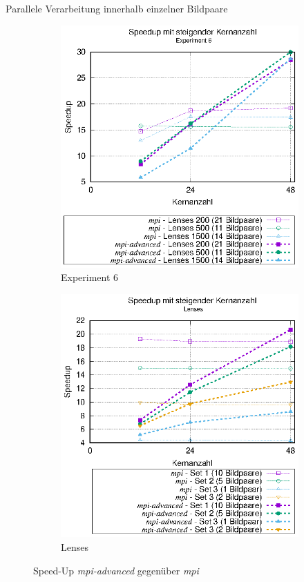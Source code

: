 \begin{frame}[allowframebreaks]{Parallele Verarbeitung innerhalb einzelner Bildpaare}
	\begin{figure}[h]
		\begin{subfigure}[b]{0.47\textwidth}
			\centering
			\includegraphics[width=\textwidth]{pdf/mpi_advanced_speedup_exp6}
			\caption{Experiment 6}
		\end{subfigure}
		\hfill
		\begin{subfigure}[b]{0.47\textwidth}
			\centering
			\includegraphics[width=\textwidth]{pdf/mpi_advanced_speedup_lenses}
			\caption{Lenses}
		\end{subfigure}
		\caption{Speed-Up \textit{mpi-advanced} gegenüber \textit{mpi}}
	\end{figure}
	

\end{frame}
